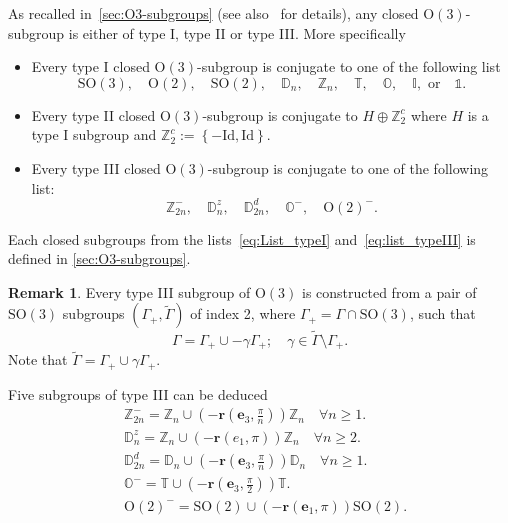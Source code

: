 \documentclass[11pt,a4paper]{amsart}
\theoremstyle{definition}
\newtheorem{rem}[thm]{Remark}
\newcommand{\ZZ}{\mathbb{Z}}                %
\newcommand{\OO}{\mathrm{O}}                %
\newcommand{\SO}{\mathrm{SO}}               %
\newcommand{\octa}{\mathbb{O}}              %
\newcommand{\ico}{\mathbb{I}}               %
\newcommand{\tetra}{\mathbb{T}}             %
\newcommand{\DD}{\mathbb{D}}                %
\newcommand{\1}{\mathds{1}}		            %
\newcommand{\id}{\mathrm{Id}}                %
\newcommand{\ee}{\pmb{e}}                   %
\newcommand{\vR}{\mathbf{r}}
\newcommand{\set}[1]{\left\{#1\right\}}     %
\newcommand{\Dnz}{\DD_n^z}
\newcommand{\Dnd}{\DD_{2n}^d}
\begin{document}
As recalled in~\autoref{sec:O3-subgroups} (see also~\cite{Ihrig1984} for details), any closed $\OO(3)$-subgroup is either of type I, type II or type III. More specifically
\begin{itemize}
  \item Every type I closed $\OO(3)$-subgroup is conjugate to one of the following list
        \begin{equation}\label{eq:List_typeI}
          \SO(3),\quad \OO(2),\quad \SO(2), \quad \DD_n, \quad \ZZ_n, \quad \tetra, \quad \octa, \quad \ico, \text{ or} \quad \1.
        \end{equation}
  \item Every type II closed $\OO(3)$-subgroup is conjugate to $H\oplus \ZZ_2^c$ where $H$ is a type I subgroup and $\ZZ_2^c:=\set{-\id,\id}$.
  \item Every type III closed $\OO(3)$-subgroup is conjugate to one of the following list:
        \begin{equation}\label{eq:list_typeIII}
          \ZZ_{2n}^{-},\quad \Dnz,\quad \Dnd,\quad \octa^-,\quad \OO(2)^-.
        \end{equation}
\end{itemize}

Each closed subgroups from the lists~\eqref{eq:List_typeI} and~\eqref{eq:list_typeIII} is defined in \autoref{sec:O3-subgroups}.
\begin{rem}\label{rem:typeIII}
	Every type III subgroup of $\OO(3)$ is constructed from a pair of $\SO(3)$ subgroups $(\Gamma_+,\tilde{\Gamma})$ of index 2, where $\Gamma_+=\Gamma\cap\SO(3)$, such that 
	\begin{equation*}
	\Gamma=\Gamma_+\cup -\gamma \Gamma_+;\quad \gamma\in \tilde{\Gamma}\setminus \Gamma_+.
	\end{equation*}
	Note that $\tilde{\Gamma}=\Gamma_+\cup \gamma\Gamma_+$.
\end{rem}

Five subgroups of type III can be deduced
  \begin{align} \label{typeIII}
	& \ZZ_{2n}^-=\ZZ_n \cup (-\vR(\ee_3,\frac{\pi}{n})) \ZZ_n \quad \forall n \geq 1. \\
	& \Dnz=\ZZ_n \cup (-\vR(e_1,\pi))\ZZ_n  \quad \forall n\geq2.                     \\
	& \Dnd=\DD_n \cup (-\vR(\ee_3,\frac{\pi}{n})) \DD_n \quad \forall n \geq 1.       \\
	& \octa^-=\tetra \cup (-\vR(\ee_3,\frac{\pi}{2})) \tetra.                         \\
	& \OO(2)^-=\SO(2)\cup (-\vR(\ee_1,\pi)) \SO(2).
\end{align}
\end{document}
